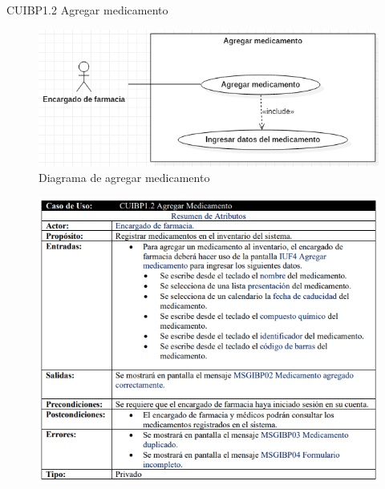 \documentclass[12pt,letterpaper]{article}
\begin{document}
            \newpage
            CUIBP1.2 Agregar medicamento 
            \begin{figure}[H]
                \centering
                \includegraphics [scale=0.5]{casosUso/agregarMedicamento}
                \caption{Diagrama de agregar medicamento}
            \end{figure}
            \begin{figure}[H]
                \centering
                \includegraphics [scale=0.75]{specs/specAgregarMedicamento}
            \end{figure}
\end{document}
